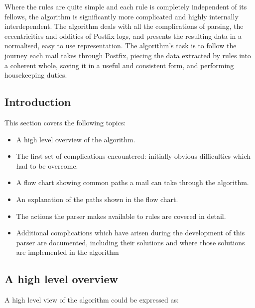 \documentclass[a4paper,12pt,draft]{article}
\begin{document}
\label{parsing-algorithm}

Where the rules are quite simple and each rule is completely independent of
its fellows, the algorithm is significantly more complicated and highly
internally interdependent.  The algorithm deals with all the complications
of parsing, the eccentricities and oddities of Postfix logs, and presents
the resulting data in a normalised, easy to use representation.  The
algorithm's task is to follow the journey each mail takes through Postfix,
piecing the data extracted by rules into a coherent whole, saving it in a
useful and consistent form, and performing housekeeping duties.

\subsection{Introduction}

This section covers the following topics:

\begin{itemize}

    \item A high level overview of the algorithm.

    \item The first set of complications encountered: initially obvious
        difficulties which had to be overcome.

    \item A flow chart showing common paths a mail can take through the
        algorithm.

    \item An explanation of the paths shown in the flow chart.

    \item The actions the parser makes available to rules are covered in
        detail.

    \item Additional complications which have arisen during the development
        of this parser are documented, including their solutions and where
        those solutions are implemented in the algorithm

\end{itemize}

\subsection{A high level overview}

A high level view of the algorithm could be expressed as:
\end{document}
